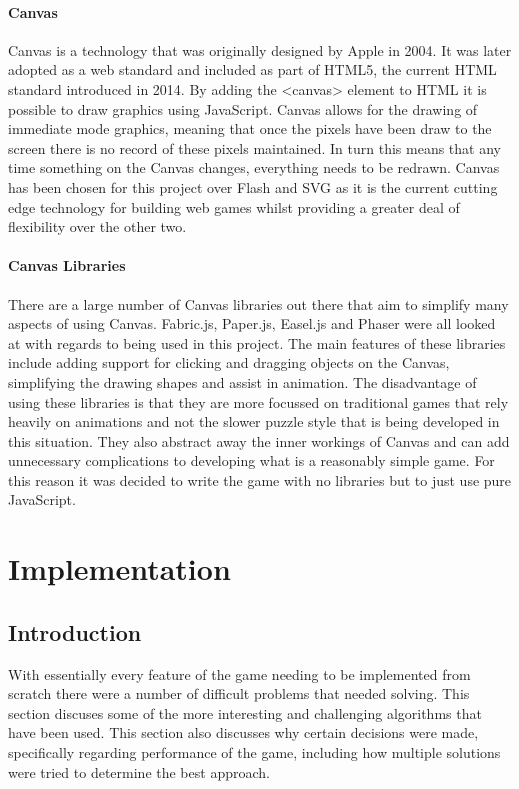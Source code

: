 \documentclass[12pt,a4paper]{report}
\begin{document}
\subsubsection{Canvas}
Canvas is a technology that was originally designed by Apple in 2004. It was later adopted as a web standard and included as part of HTML5, the current HTML standard introduced in 2014. By adding the <canvas> element to HTML it is possible to draw graphics using JavaScript. Canvas allows for the drawing of immediate mode graphics, meaning that once the pixels have been draw to the screen there is no record of these pixels maintained. In turn this means that any time something on the Canvas changes, everything needs to be redrawn. Canvas has been chosen for this project over Flash and SVG as it is the current cutting edge technology for building web games whilst providing a greater deal of flexibility over the other two.

\subsubsection{Canvas Libraries}
There are a large number of Canvas libraries out there that aim to simplify many aspects of using Canvas. Fabric.js, Paper.js, Easel.js and Phaser were all looked at with regards to being used in this project. The main features of these libraries include adding support for clicking and dragging objects on the Canvas, simplifying the drawing shapes and assist in animation.
The disadvantage of using these libraries is that they are more focussed on traditional games that rely heavily on animations and not the slower puzzle style that is being developed in this situation. They also abstract away the inner workings of Canvas and can add unnecessary complications to developing what is a reasonably simple game. For this reason it was decided to write the game with no libraries but to just use pure JavaScript.


\chapter{Implementation}

\section{Introduction}
With essentially every feature of the game needing to be implemented from scratch there were a number of difficult problems that needed solving. This section discuses some of the more interesting and challenging algorithms that have been used. This section also discusses why certain decisions were made, specifically regarding performance of the game, including how multiple solutions were tried to determine the best approach. 
\end{document}
